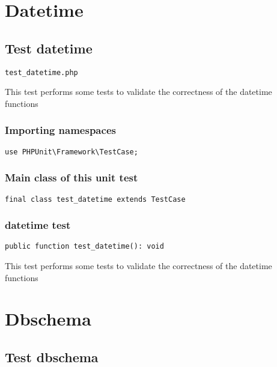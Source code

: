\documentclass[a4paper]{article}
\begin{document}
\hypertarget{toc140}{}
\section{Datetime}

\hypertarget{toc141}{}
\subsection{Test datetime}

\begin{lstlisting}
test_datetime.php
\end{lstlisting}

This test performs some tests to validate the correctness
of the datetime functions

\hypertarget{toc142}{}
\subsubsection{Importing namespaces}

\begin{lstlisting}
use PHPUnit\Framework\TestCase;
\end{lstlisting}

\hypertarget{toc143}{}
\subsubsection{Main class of this unit test}

\begin{lstlisting}
final class test_datetime extends TestCase
\end{lstlisting}

\hypertarget{toc144}{}
\subsubsection{datetime test}

\begin{lstlisting}
public function test_datetime(): void
\end{lstlisting}

This test performs some tests to validate the correctness
of the datetime functions


\hypertarget{toc145}{}
\section{Dbschema}

\hypertarget{toc146}{}
\subsection{Test dbschema}
\end{document}
